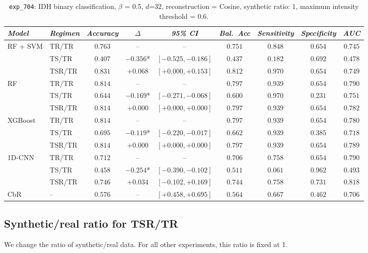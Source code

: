 \begin{table}[H]
\centering
\scriptsize

\label{tab:ctrl_exp_704}
\begin{tabular*}{\textwidth}{@{\extracolsep{\fill}}llccccccc}
\toprule
\emph{Model} & \emph{Regimen} & \emph{Accuracy} & \emph{$\Delta$} & \emph{95\% CI} & \emph{Bal.\ Acc} & \emph{Sensitivity} & \emph{Specificity} & \emph{AUC}\\
\midrule
\multirow{3}{*}{RF + SVM} & TR/TR & $0.763$ & -- & -- & $0.751$ & $0.848$ & $0.654$ & $0.745$\\
 & TS/TR & $0.407$ & $-0.356$* & $[-0.525, -0.186]$ & $0.437$ & $0.182$ & $0.692$ & $0.478$\\
 & TSR/TR & $0.831$ & $+0.068$ & $[+0.000, +0.153]$ & $0.812$ & $0.970$ & $0.654$ & $0.749$\\
\midrule
\multirow{3}{*}{RF} & TR/TR & $0.814$ & -- & -- & $0.797$ & $0.939$ & $0.654$ & $0.790$\\
 & TS/TR & $0.644$ & $-0.169$* & $[-0.271, -0.068]$ & $0.600$ & $0.970$ & $0.231$ & $0.751$\\
 & TSR/TR & $0.814$ & $+0.000$ & $[+0.000, +0.000]$ & $0.797$ & $0.939$ & $0.654$ & $0.782$\\
\midrule
\multirow{3}{*}{XGBoost} & TR/TR & $0.814$ & -- & -- & $0.797$ & $0.939$ & $0.654$ & $0.780$\\
 & TS/TR & $0.695$ & $-0.119$* & $[-0.220, -0.017]$ & $0.662$ & $0.939$ & $0.385$ & $0.718$\\
 & TSR/TR & $0.814$ & $+0.000$ & $[+0.000, +0.000]$ & $0.797$ & $0.939$ & $0.654$ & $0.789$\\
\midrule
\multirow{3}{*}{1D-CNN} & TR/TR & $0.712$ & -- & -- & $0.706$ & $0.758$ & $0.654$ & $0.790$\\
 & TS/TR & $0.458$ & $-0.254$* & $[-0.390, -0.102]$ & $0.511$ & $0.061$ & $0.962$ & $0.493$\\
 & TSR/TR & $0.746$ & $+0.034$ & $[-0.102, +0.169]$ & $0.744$ & $0.758$ & $0.731$ & $0.818$\\
\midrule
CbR & -- & $0.576$ & -- & $[+0.458, +0.695]$ & $0.564$ & $0.667$ & $0.462$ & $0.706$\\
\bottomrule
\end{tabular*}
\caption{\small \texttt{exp\_704}: IDH binary classification, $\beta$ = 0.5, $d$=32, reconstruction = Cosine, synthetic ratio: 1, maximum intensity threshold = 0.6.}
\end{table}

\subsection*{Synthetic/real ratio for TSR/TR}
\label{app:synth-ratio}
We change the ratio of synthetic/real data. For all other experiments, this ratio is fixed at 1.

